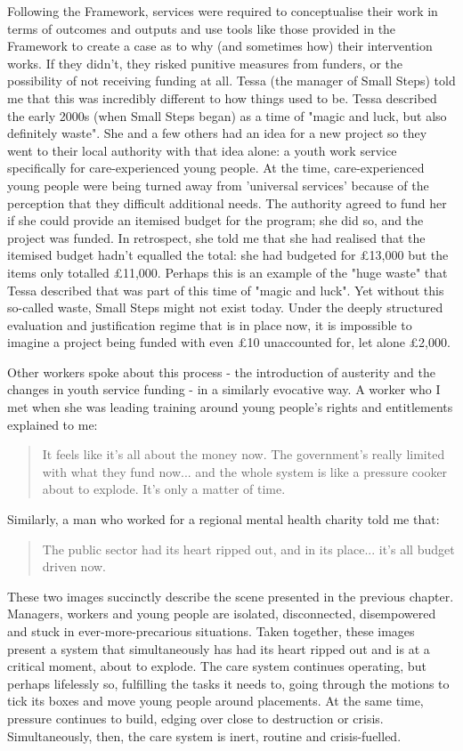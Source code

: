 Following the Framework, services were required to conceptualise their work in terms of outcomes and outputs and use tools like those provided in the Framework to create a case as to why (and sometimes how) their intervention works. If they didn't, they risked punitive measures from funders, or the possibility of not receiving funding at all. Tessa (the manager of Small Steps) told me that this was incredibly different to how things used to be. Tessa described the early 2000s (when Small Steps began) as a time of "magic and luck, but also definitely waste". She and a few others had an idea for a new project so they went to their local authority with that idea alone: a youth work service specifically for care-experienced young people. At the time, care-experienced young people were being turned away from 'universal services' because of the perception that they difficult additional needs. The authority agreed to fund her if she could provide an itemised budget for the program; she did so, and the project was funded. In retrospect, she told me that she had realised that the itemised budget hadn't equalled the total: she had budgeted for £13,000 but the items only totalled £11,000. Perhaps this is an example of the "huge waste" that Tessa described that was part of this time of "magic and luck". Yet without this so-called waste, Small Steps might not exist today. Under the deeply structured evaluation and justification regime that is in place now, it is impossible to imagine a project being funded with even £10 unaccounted for, let alone £2,000.

Other workers spoke about this process - the introduction of austerity and the changes in youth service funding - in a similarly evocative way. A worker who I met when she was leading training around young people's rights and entitlements explained to me:
\begin{quote}
It feels like it's all about the money now. The government's really limited with what they fund now... and the whole system is like a pressure cooker about to explode. It's only a matter of time.
\end{quote}
Similarly, a man who worked for a regional mental health charity told me that:
\begin{quote}
The public sector had its heart ripped out, and in its place... it's all budget driven now.
\end{quote}
These two images succinctly describe the scene presented in the previous chapter. Managers, workers and young people are isolated, disconnected, disempowered and stuck in ever-more-precarious situations. Taken together, these images present a system that simultaneously has had its heart ripped out and is at a critical moment, about to explode. The care system continues operating, but perhaps lifelessly so, fulfilling the tasks it needs to, going through the motions to tick its boxes and move young people around placements. At the same time, pressure continues to build, edging over close to destruction or crisis. Simultaneously, then, the care system is inert, routine and crisis-fuelled. 

